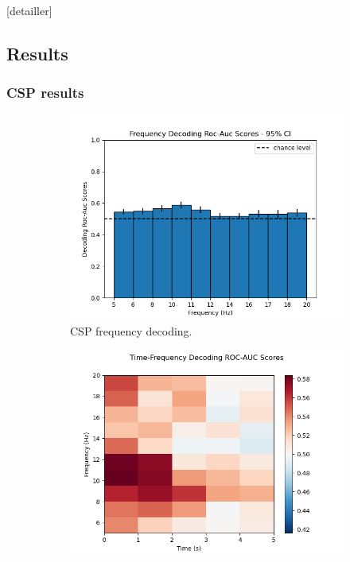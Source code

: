 [detailler]



\subsection{Results}

\subsubsection{CSP results}


\begin{figure}
    \centering
    \begin{subfigure}{.5\textwidth}
        \centering
        \includegraphics[width=1.\linewidth]{images_report/sensor/csp_permutation_res/csp_frequency.png}
        \caption{CSP frequency decoding.}
        \label{fig:csp_frequency}
    \end{subfigure}%
    \begin{subfigure}{.5\textwidth}
        \centering
        \includegraphics[width=1.\linewidth]{images_report/sensor/csp_permutation_res/csp_time_frequency.png}

\end{subfigure}
\end{figure}
